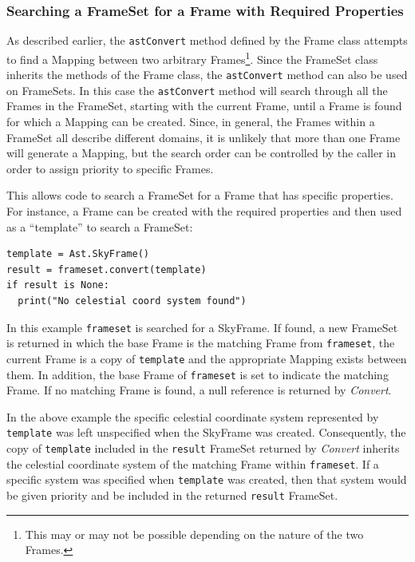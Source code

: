 \documentclass[final,authoryear,5p,times,twocolumn]{elsarticle}
\begin{document}
\subsubsection{Searching a FrameSet for a Frame with Required Properties}
As described earlier, the \texttt{astConvert} method defined by the Frame
class attempts to find a Mapping between two arbitrary
Frames\footnote{This may or may not be possible depending on the nature
of the two Frames.}. Since the FrameSet class inherits the methods of the
Frame class, the \texttt{astConvert} method can also be used on FrameSets. In
this case the \texttt{astConvert} method will search through all the Frames
in the FrameSet, starting with the current Frame, until a Frame is found
for which a Mapping can be created. Since, in general, the Frames within a
FrameSet all describe different domains, it is unlikely that more than one
Frame will generate a Mapping, but the search order can be controlled by
the caller in order to assign priority to specific Frames.

This allows code to search a FrameSet for a Frame that has specific
properties. For instance, a Frame can be created with the required
properties and then used as a ``template'' to search a FrameSet:

\begin{lstlisting}
template = Ast.SkyFrame()
result = frameset.convert(template)
if result is None:
  print("No celestial coord system found")
\end{lstlisting}

In this example \texttt{frameset} is searched for a SkyFrame. If found, a
new FrameSet is returned in which the base Frame is the matching Frame
from \texttt{frameset}, the current Frame is a copy of \texttt{template} and
the appropriate Mapping exists between them. In addition, the base Frame
of \texttt{frameset} is set to indicate the matching Frame. If no matching
Frame is found, a null reference is returned by \emph{Convert}.

In the above example the specific celestial coordinate system represented
by \texttt{template} was left unspecified when the SkyFrame was created.
Consequently, the copy of \texttt{template} included in the
\texttt{result} FrameSet returned by \emph{Convert} inherits the
celestial coordinate system of the matching Frame within
\texttt{frameset}. If a specific system was specified when \texttt{template}
was created, then that system would be given priority and be included in
the returned \texttt{result} FrameSet.
\end{document}
